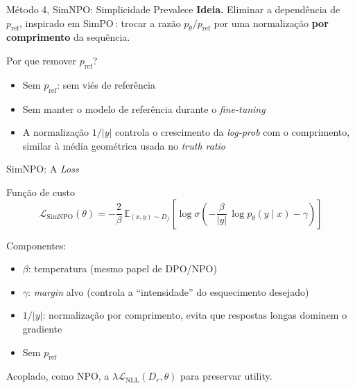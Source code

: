 \documentclass[aspectratio=169,xcolor=dvipsnames]{beamer}
\begin{document}
  \begin{frame}{Método 4, SimNPO: Simplicidade Prevalece}
    \textbf{Ideia.} Eliminar a dependência de $p_{\text{ref}}$, inspirado em SimPO\,: trocar a razão $p_\theta / p_{\text{ref}}$ por uma normalização \textbf{por comprimento} da sequência.

    \vspace{0.3em}
    \begin{block}{Por que remover $p_{\text{ref}}$?}
      \begin{itemize}\setlength{\itemsep}{0pt}
        \item Sem $p_{\text{ref}}$: sem viés de referência
        \item Sem manter o modelo de referência durante o \textit{fine-tuning}
        \item A normalização $1/|y|$ controla o crescimento da \textit{log-prob} com o comprimento, similar à média geométrica usada no \textit{truth ratio}
      \end{itemize}
    \end{block}
  \end{frame}

  \begin{frame}{SimNPO: A \textit{Loss}}
    \begin{block}{Função de custo}
      \[
        \mathcal{L}_{\text{SimNPO}}(\theta) = -\frac{2}{\beta}\, \mathbb{E}_{(x,y) \sim D_f}\left[
          \log \sigma\left( -\frac{\beta}{|y|}\, \log p_\theta(y \mid x) - \gamma \right)
        \right]
      \]
    \end{block}

    \vspace{0.3em}
    Componentes:
    \begin{itemize}\setlength{\itemsep}{0pt}
      \item $\beta$: temperatura (mesmo papel de DPO/NPO)
      \item $\gamma$: \textit{margin} alvo (controla a ``intensidade'' do esquecimento desejado)
      \item $1/|y|$: normalização por comprimento, evita que respostas longas dominem o gradiente
      \item Sem $p_{\text{ref}}$
    \end{itemize}

    \vspace{0.3em}
    Acoplado, como NPO, a $\lambda \mathcal{L}_{\text{NLL}}(D_r, \theta)$ para preservar utility.
  \end{frame}
\end{document}

